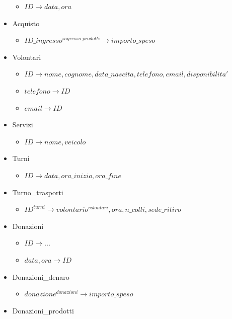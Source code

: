 \documentclass[]{article}
\providecommand{\tightlist}{%
  \setlength{\itemsep}{0pt}\setlength{\parskip}{0pt}}
\begin{document}
\begin{itemize}
  \begin{itemize}
  \tightlist
  \item
    \(ID \to data, ora\)
  \end{itemize}
\item
  Acquisto

  \begin{itemize}
  \tightlist
  \item
    \(ID\_ingresso^{ingresso\_prodotti} \to importo\_speso\)
  \end{itemize}
\item
  Volontari

  \begin{itemize}
  \tightlist
  \item
    \(ID \to nome, cognome, data\_nascita, telefono, email, disponibilita'\)
  \item
    \(telefono \to ID\)
  \item
    \(email \to ID\)
  \end{itemize}
\item
  Servizi

  \begin{itemize}
  \tightlist
  \item
    \(ID \to nome, veicolo\)
  \end{itemize}
\item
  Turni

  \begin{itemize}
  \tightlist
  \item
    \(ID \to data, ora\_inizio, ora\_fine\)
  \end{itemize}
\item
  Turno\_trasporti

  \begin{itemize}
  \tightlist
  \item
    \(ID^{turni} \to volontario^{volontari}, ora, n\_colli, sede\_ritiro\)
  \end{itemize}
\item
  Donazioni

  \begin{itemize}
  \tightlist
  \item
    \(ID \to ...\)
  \item
    \(data, ora \to ID\)
  \end{itemize}
\item
  Donazioni\_denaro

  \begin{itemize}
  \tightlist
  \item
    \(donazione^{donazioni} \to importo\_speso\)
  \end{itemize}
\item
  Donazioni\_prodotti


\end{itemize}
\end{document}
